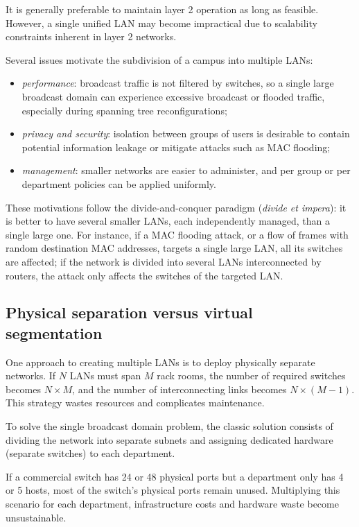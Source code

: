 \documentclass[11pt,a4paper,openany]{report}
\begin{document}
It is generally preferable to maintain layer 2 operation as long as feasible. However, a single unified LAN may become impractical due to scalability constraints inherent in layer 2 networks.

Several issues motivate the subdivision of a campus into multiple LANs:

\begin{itemize}
\item \emph{performance}: broadcast traffic is not filtered by switches, so a single large broadcast domain can experience excessive broadcast or flooded traffic, especially during spanning tree reconfigurations;
\item \emph{privacy and security}: isolation between groups of users is desirable to contain potential information leakage or mitigate attacks such as MAC flooding;
\item \emph{management}: smaller networks are easier to administer, and per group or per department policies can be applied uniformly.
\end{itemize}

These motivations follow the divide-and-conquer paradigm (\emph{divide et impera}): it is better to have several smaller LANs, each independently managed, than a single large one. For instance, if a MAC flooding attack, or a flow of frames with random destination MAC addresses, targets a single large LAN, all its switches are affected; if the network is divided into several LANs interconnected by routers, the attack only affects the switches of the targeted LAN.

\subsection{Physical separation versus virtual segmentation}

One approach to creating multiple LANs is to deploy physically separate networks. If \(N\) LANs must span \(M\) rack rooms, the number of required switches becomes \(N \times M\), and the number of interconnecting links becomes \(N \times (M - 1)\). This strategy wastes resources and complicates maintenance.

To solve the single broadcast domain problem, the classic solution consists of dividing the network into separate subnets and assigning dedicated hardware (separate switches) to each department.

If a commercial switch has 24 or 48 physical ports but a department only has 4 or 5 hosts, most of the switch's physical ports remain unused. Multiplying this scenario for each department, infrastructure costs and hardware waste become unsustainable.
\end{document}
